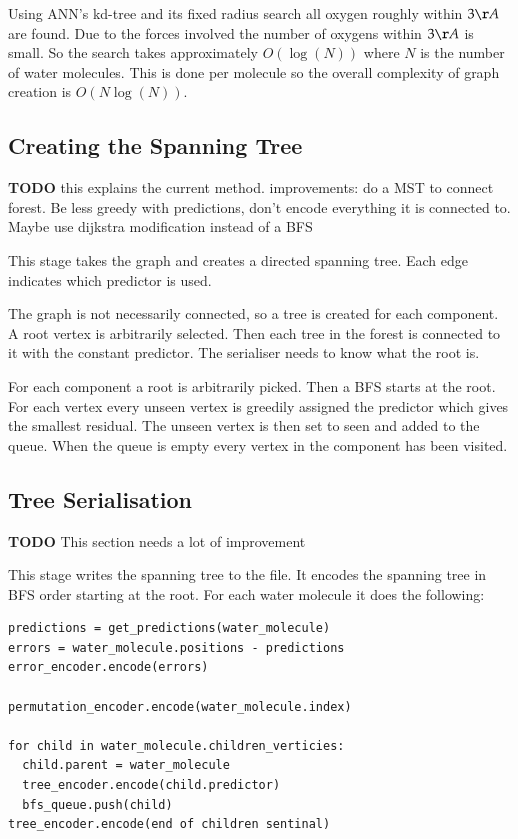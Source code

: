 \documentclass{report}
\newcommand{\todo}{\textbf{TODO} }
\begin{document}
Using ANN's kd-tree and its fixed radius search all oxygen roughly within
$3\AA$ are found. Due to the forces involved the number of oxygens within
$3\AA$ is small. So the search takes approximately $O(\log(N))$ where $N$ is
the number of water molecules. This is done per molecule so the overall
complexity of graph creation is $O(N\log(N))$.


\subsection{Creating the Spanning Tree}

\todo this explains the current method. improvements: do a MST to connect
forest. Be less greedy with predictions, don't encode everything it is
connected to. Maybe use dijkstra modification instead of a BFS

This stage takes the graph and creates a directed spanning tree. Each edge
indicates which predictor is used.

The graph is not necessarily connected, so a tree is created for each
component. A root vertex is arbitrarily selected. Then each tree in the forest
is connected to it with the constant predictor. The serialiser needs to know
what the root is.

For each component a root is arbitrarily picked. Then a BFS starts at the
root. For each vertex every unseen vertex is greedily assigned the predictor
which gives the smallest residual. The unseen vertex is then set to seen and
added to the queue. When the queue is empty every vertex in the component has
been visited.


\subsection{Tree Serialisation}

\todo This section needs a lot of improvement

This stage writes the spanning tree to the file. It encodes the spanning tree
in BFS order starting at the root. For each water molecule it does the following:

\begin{verbatim}
predictions = get_predictions(water_molecule)
errors = water_molecule.positions - predictions
error_encoder.encode(errors)

permutation_encoder.encode(water_molecule.index)

for child in water_molecule.children_verticies:
  child.parent = water_molecule
  tree_encoder.encode(child.predictor)
  bfs_queue.push(child)
tree_encoder.encode(end of children sentinal)
\end{verbatim}
\end{document}
